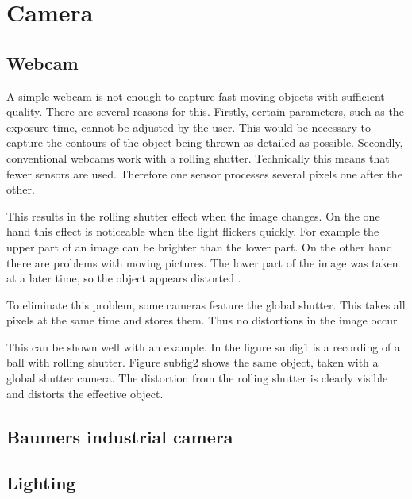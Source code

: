 \section{Camera}
\label{sec:camera}
\subsection{Webcam}
\label{subsec:webcam}
A simple webcam is not enough to capture fast moving objects with sufficient quality. 
There are several reasons for this.
Firstly, certain parameters, such as the exposure time, cannot be adjusted by the user.
This would be necessary to capture the contours of the object being thrown as detailed as possible.
Secondly, conventional webcams work with a rolling shutter.
Technically this means that fewer sensors are used. Therefore one sensor processes several pixels one after the other.

This results in the rolling shutter effect when the image changes.
On the one hand this effect is noticeable when the light flickers quickly.
For example the upper part of an image can be brighter than the lower part.
On the other hand there are problems with moving pictures.
The lower part of the image was taken at a later time, so the object appears distorted \cite{GlobalRollingShutter}.

To eliminate this problem, some cameras feature the global shutter. 
This takes all pixels at the same time and stores them. 
Thus no distortions in the image occur.

This can be shown well with an example.
In the figure subfig1 is a recording of a ball with rolling shutter. 
Figure subfig2 shows the same object, taken with a global shutter camera.
The distortion from the rolling shutter is clearly visible and distorts the effective object.


\subsection{Baumers industrial camera}
\label{subsec:baumer_cam}

\subsection{Lighting}
\label{subsec:Lighting}
